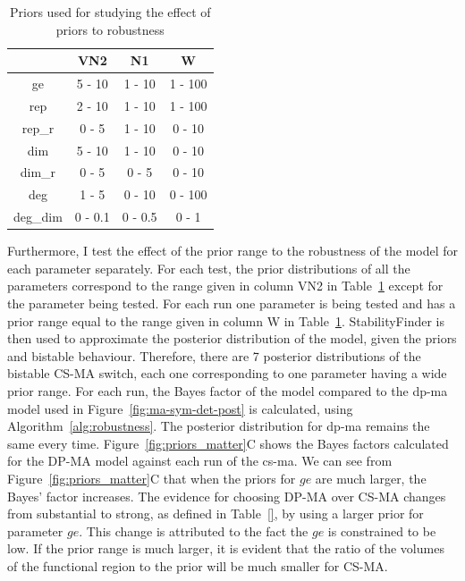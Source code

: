 \begin{table}[tb]
\centering
\caption{Priors used for studying the effect of priors to robustness}
\label{tab:prior_study}
\begin{tabular}{@{}cccc@{}}
\toprule
         & VN2 & N1  & W    \\ \midrule
ge       & 5 - 10      & 1 - 10  & 1 - 100 \\
rep      & 2 - 10      & 1 - 10  & 1 - 100 \\
rep\_r   & 0 - 5       & 1 - 10  & 0 - 10  \\
dim      & 5 - 10      & 1 - 10  & 0 - 10  \\
dim\_r   & 0 - 5       & 0 - 5   & 0 - 10  \\
deg      & 1 - 5       & 0 - 10  & 0 - 100 \\
deg\_dim & 0 - 0.1     & 0 - 0.5 & 0 - 1   \\ \bottomrule
\end{tabular}
\end{table}

Furthermore, I test the effect of the prior range to the robustness of the model for each parameter separately. For each test, the prior distributions of all the parameters correspond to the range given in column VN2 in Table~\ref{tab:prior_study} except for the parameter being tested. For each run one parameter is being tested and has a prior range equal to the range given in column W in Table~\ref{tab:prior_study}. StabilityFinder is then used to approximate the posterior distribution of the model, given the priors and bistable behaviour. Therefore, there are 7 posterior distributions of the bistable CS-MA switch, each one corresponding to one parameter having a wide prior range. For each run, the Bayes factor of the model compared to the \acrshort{dp-ma} model used in Figure~\ref{fig:ma-sym-det-post} is calculated, using Algorithm~\ref{alg:robustness}. The posterior distribution for \acrshort{dp-ma} remains the same every time. Figure~\ref{fig:priors_matter}C shows the Bayes factors calculated for the DP-MA model against each run of the \acrshort{cs-ma}. We can see from Figure~\ref{fig:priors_matter}C that when the priors for $ge$ are much larger, the Bayes' factor increases. The evidence for choosing DP-MA over CS-MA changes from substantial to strong, as defined in Table~\ref{}, by using a larger prior for parameter $ge$. This change is attributed to the fact the $ge$ is constrained to be low. If the prior range is much larger, it is evident that the ratio of the volumes of the functional region to the prior will be much smaller for CS-MA. %
 

